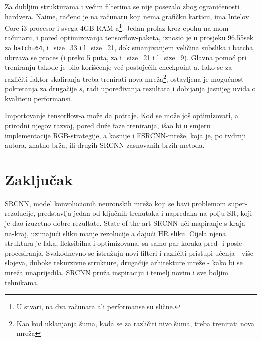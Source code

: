\documentclass[12pt]{report}
\numberwithin{equation}{section}
\begin{document}
  
    Za dubljim strukturama i većim filterima se nije posezalo zbog ograničenosti hardvera. Naime, rađeno je na računaru koji nema grafičku karticu, ima Intelov Core i3 procesor i svega 4GB RAM-a\footnote{U stvari, na dva računara ali performanse su slične.}. Jedan prolaz kroz epohu na mom računaru, i pored optimizovanja tensorflow-paketa, iznosio je u prosjeku 96.55sek za \texttt{batch=64}, i\_size=33 i l\_size=21, dok smanjivanjem veličina subslika i batcha, ubrzava se proces (i preko 5 puta, za i\_size=21 i l\_size=9). Glavna pomoć pri treniranju takođe je bilo korišćenje već postojećih checkpoint-a. Iako se za različiti faktor skaliranja treba trenirati nova mreža\footnote{Kao kod uklanjanja šuma, kada se za različiti nivo šuma, treba trenirati nova mreža}, ostavljena je mogućnost pokretanja za drugačije $s$, radi upoređivanja rezultata i dobijanja jasnijeg uvida o kvalitetu performansi. 
  
 Importovanje tensorflow-a može da potraje. Kod se može još optimizovati, a prirodni njegov razvoj, pored duže faze treniranja, išao bi u smjeru implementacije RGB-strategije, a kasnije i FSRCNN-mreže, koja je, po tvdrnji autora, znatno brža, ili drugih SRCNN-zasnovanih brzih metoda. 

  
  
 
    


\chapter{Zaključak}\label{ch2}  
  

  SRCNN, model konvolucionih neuronskih mreža koji se bavi problemom super-rezolucije, predstavlja jedan od ključnih trenutaka i napredaka na polju SR, koji je dao izuzetno dobre rezultate. State-of-the-art SRCNN uči mapiranje s-kraja-na-kraj, uzimajući sliku manje rezolucije a dajući HR sliku. Cijela njena struktura je laka, fleksibilna i optimizovana, sa samo par koraka pred- i posle-procesiranja. Svakodnevno se istražuju novi filteri i različiti pristupi učenja - više slojeva, duboke rekurzivne strukture, drugačije arhitekture mreže - kako bi se mreža unaprijedila. SRCNN pruža inspiraciju i temelj novim i sve boljim tehnikama.
 
\end{document}
